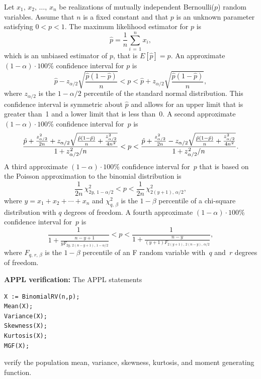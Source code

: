 \documentclass[12pt,fullpage]{article}
\begin{document}
\noindent
Let $x_1, \, x_2, \, \ldots , \, x_n$ be realizations of mutually independent Bernoulli($p$) random variables.
Assume that $n$ is a fixed constant and that $p$ is an unknown parameter satisfying $0 < p < 1$.
The maximum likelihood estimator  for $p$ is
$$
\hat p = \frac{1}{n} \sum_{i\,=\,1}^n x_i,
$$
which is an unbiased estimator of $p$, that is $E\left[ \hat p \right] = p$.
An approximate ${(1 - \alpha) \cdot 100}$\% confidence interval for $p$ is 
$$
\hat p - z _ {\alpha / 2} \sqrt{  \frac{ \hat{p} ( 1 - \hat{p} ) }{ n } }
< p <
\hat p + z _ {\alpha / 2} \sqrt{  \frac{ \hat{p} ( 1 - \hat{p} ) }{ n } },
$$
where $z _ {\alpha / 2}$ is the $1 - \alpha / 2$ percentile of the standard normal
distribution.
This confidence interval is symmetric about $\hat p$ and allows for an upper limit
that is greater than~1 and a lower limit that is less than~0.
A second approximate ${(1 - \alpha) \cdot 100}$\% confidence interval for~$p$ is
$$
\frac{\hat{p}+\frac{z_{\alpha/2}^{\kern 0.04em 2}}{2n}+z_{\alpha/2}\sqrt{\frac{\hat{p}\left(1-\hat{p}\right)}{n}+\frac{z_{\alpha/2}^{\kern 0.04em 2}}{4n^{\kern 0.04em 2}}}}{1+z_{\alpha/2}^{\kern 0.04em 2}/n}  < p < \frac{\hat{p}+\frac{z_{\alpha/2}^{\kern 0.04em 2}}{2n}-z_{\alpha/2}\sqrt{\frac{\hat{p}\left(1-\hat{p}\right)}{n}+\frac{z_{\alpha/2}^{\kern 0.04em 2}}{4n^{\kern 0.04em 2}}}}{1+z_{\alpha/2}^{\kern 0.04em 2}/n}.
$$
A third approximate ${(1 - \alpha) \cdot 100}$\% confidence interval for~$p$ that is
based on the Poisson approximation to the binomial distribution is
$$
\frac{1}{2n} \, \chi^2_{2y, \, 1 - \alpha / 2} < p < \frac{1}{2n} \, \chi^2_{2(y+1), \, \alpha / 2},
$$
where $y = x_1 + x_2 + \cdots + x_n$ and
$\chi^2_{q, \, \beta}$ is the $1 - \beta$ percentile of a chi-square 
distribution with $q$ degrees of freedom.
A fourth approximate ${(1 - \alpha) \cdot 100}$\% confidence interval for~$p$ is
$$
\frac{1}{1 + \frac{n - y + 1}{y F_{2y, \, 2(n - y + 1), \, 1 - \alpha / 2}}}
< p <
\frac{1}{1 + \frac{n - y}{(y + 1) F_{2(y + 1), \, 2(n - y), \, \alpha / 2}}},
$$
where $F_{q, \, r, \, \beta}$ is the $1 - \beta$ percentile of an F random variable
with~$q$ and~$r$ degrees of freedom.

\vspace{0.1in}

\newpage

\noindent
{\bf APPL verification:}
The APPL statements
\begin{verbatim}
X := BinomialRV(n,p);
Mean(X);
Variance(X);
Skewness(X);
Kurtosis(X);
MGF(X);
\end{verbatim}
verify the population mean, variance, skewness, kurtosis, and moment generating function.
\end{document}
